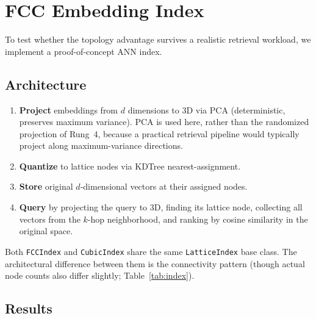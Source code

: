 \documentclass[11pt]{article}
\begin{document}
\section{FCC Embedding Index}
\label{sec:index}

To test whether the topology advantage survives a realistic
retrieval workload, we implement a proof-of-concept ANN index.

\subsection{Architecture}

\begin{enumerate}
  \item \textbf{Project} embeddings from $d$ dimensions to 3D via
    PCA (deterministic, preserves maximum variance). PCA is used
    here, rather than the randomized projection of Rung~4, because a
    practical retrieval pipeline would typically project along
    maximum-variance directions.
  \item \textbf{Quantize} to lattice nodes via KDTree
    nearest-assignment.
  \item \textbf{Store} original $d$-dimensional vectors at their
    assigned nodes.
  \item \textbf{Query} by projecting the query to 3D, finding its
    lattice node, collecting all vectors from the $k$-hop
    neighborhood, and ranking by cosine similarity in the original
    space.
\end{enumerate}

Both \texttt{FCCIndex} and \texttt{CubicIndex} share the same
\texttt{LatticeIndex} base class. The architectural difference between them is the
connectivity pattern (though actual node counts also differ slightly;
Table~\ref{tab:index}).

\subsection{Results}
\end{document}
